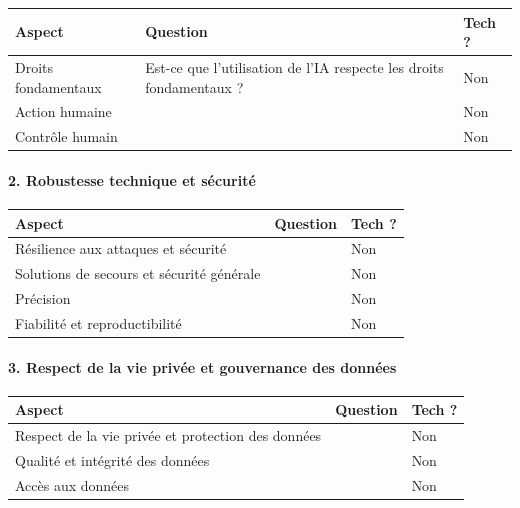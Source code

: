 \documentclass[10pt, french, a4paper]{report}
\begin{document}
\begin{center}
  \begin{tabular}{ |p{4cm}|p{6cm}|p{2cm}| } 
    \hline
    Aspect & Question & Tech ? \\
    \hline
    \hline
    Droits fondamentaux & Est-ce que l'utilisation de l'IA respecte les droits fondamentaux ? & Non \\
    \hline
    Action humaine & & Non \\
    \hline
    Contrôle humain & & Non \\ 
    \hline
    
  \end{tabular}
\end{center}

\paragraph{2. Robustesse technique et sécurité}

\begin{center}
  \begin{tabular}{ |p{4cm}|p{6cm}|p{2cm}| } 
    \hline
    Aspect & Question & Tech ? \\
    \hline
    \hline
    Résilience aux attaques et sécurité &  & Non \\
    \hline
    Solutions de secours et sécurité générale &  & Non \\
    \hline
    Précision &  & Non \\
    \hline
    Fiabilité et reproductibilité &  & Non \\
    \hline
    
  \end{tabular}
\end{center}

\paragraph{3. Respect de la vie privée et gouvernance des données}

\begin{center}
  \begin{tabular}{ |p{4cm}|p{6cm}|p{2cm}| } 
    \hline
    Aspect & Question & Tech ? \\
    \hline
    \hline
    Respect de la vie privée et protection des données &  & Non \\
    \hline
    Qualité et intégrité des données &  & Non \\
    \hline
    Accès aux données &  & Non \\
    \hline
    
  \end{tabular}
\end{center}
\end{document}
